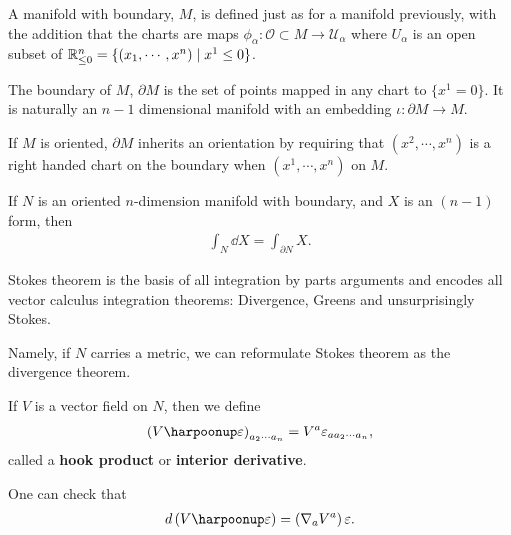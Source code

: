 
\newcommand{\vol}{\text{vol}}

\newcommand{\hook}{\harpoonup}

\begin{definition}
    A manifold with boundary, $M$, is defined just as for a manifold previously, with the addition that the charts are maps $\phi_\alpha : \mathcal{O} \subset M \to \mathcal{U}_\alpha$ where $U_\alpha$ is an open subset of $\mathbb{R}_{\leq 0}^{n} = \{ \left( x_1,\cdots, x^{n} \right) \mid x^{1} \leq 0\} $.

    The boundary of $M$, $\partial M$ is the set of points mapped in any chart to $\{x^{1} = 0\}$. It is naturally an $n - 1$ dimensional manifold with an embedding $\iota : \partial M \to M$.
\end{definition}

If $M$ is oriented, $\partial M$ inherits an orientation by requiring that $\left( x^2, \cdots, x^{n} \right) $ is a right handed chart on the boundary when $\left( x^{1}, \cdots,  x^{n} \right) $ on $M$.

\begin{theorem}
    If $N$ is an oriented $n$-dimension manifold with boundary, and $X$ is an $\left( n -1 \right) $ form, then
    \begin{align}
        \int_{N} \dd{X} = \int_{\partial N} X
    .\end{align}
\end{theorem}

Stokes theorem is the basis of all integration by parts arguments and encodes all vector calculus integration theorems: Divergence, Greens and unsurprisingly Stokes.

Namely, if $N$ carries a metric, we can reformulate Stokes theorem as the divergence theorem.

\begin{definition}
    If $V$ is a vector field on $N$, then we define
    \begin{align}
        \left( V \hook \epsilon \right)_{a_2 \cdots a_n} = V^{a} \epsilon_{a a_2 \cdots a_n}
    ,\end{align}
    called a \textbf{hook product} or \textbf{interior derivative}.
\end{definition}

 One can check that
    \begin{align}
        d \left( V \hook \epsilon \right) = \left( \nabla_a V^{a} \right) \epsilon
    .\end{align}

